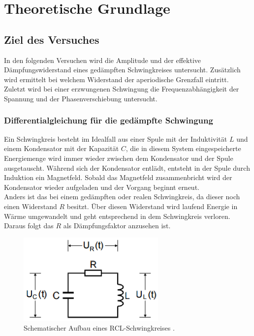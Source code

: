 \section{Theoretische Grundlage}
\label{sec:Theorie}

\subsection{Ziel des Versuches}
In den folgenden Versuchen wird die Amplitude und der effektive Dämpfungswiderstand eines gedämpften Schwingkreises untersucht. Zusätzlich wird ermittelt bei welchem Widerstand der aperiodische Grenzfall eintritt. Zuletzt wird bei einer erzwungenen Schwingung die Frequenzabhängigkeit der Spannung und der Phasenverschiebung untersucht.

\subsubsection{Differentialgleichung für die gedämpfte Schwingung}
Ein Schwingkreis besteht im Idealfall aus  einer Spule mit der Induktivität $L$ und einem Kondensator mit der Kapazität $C$, die in diesem System eingespeicherte Energiemenge wird immer wieder zwischen dem Kondensator und der Spule ausgetauscht. Während sich der Kondensator entlädt, entsteht in der Spule durch Induktion ein Magnetfeld. Sobald das Magnetfeld zusammenbricht wird der Kondensator wieder aufgeladen und der Vorgang beginnt erneut. \\
Anders ist das bei einem gedämpften oder realen Schwingkreis, da dieser noch einen Widerstand $R$ besitzt. Über diesen Widerstand wird laufend Energie in Wärme umgewandelt und geht entsprechend in dem Schwingkreis verloren. Daraus folgt das $R$ als Dämpfungsfaktor anzusehen ist.

\begin{figure}
	\centering
	\includegraphics[height=4.5cm]{picture/Theorie1.PNG}
	\caption{Schematischer Aufbau eines RCL-Schwingkreises \cite[284]{sample}.}
	\label{fig:RCL}
\end{figure}

